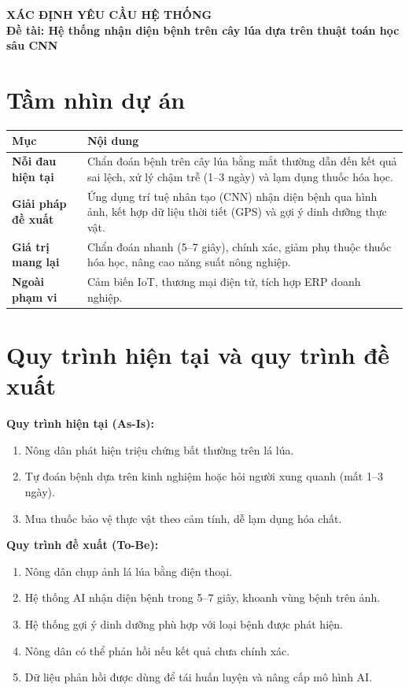 ﻿\documentclass[12pt,a4paper]{article}
\begin{document}
\begin{center}
    \Large\textbf{XÁC ĐỊNH YÊU CẦU HỆ THỐNG} \\
    \vspace{0.2cm}
    \large\textbf{Đề tài: Hệ thống nhận diện bệnh trên cây lúa dựa trên thuật toán học sâu CNN}
\end{center}

\section*{Tầm nhìn dự án}

\begin{longtable}{|p{3.5cm}|p{11cm}|}
\hline
\rowcolor{headerblue}
\textbf{Mục} & \textbf{Nội dung} \\
\hline
\textbf{Nỗi đau hiện tại} & Chẩn đoán bệnh trên cây lúa bằng mắt thường dẫn đến kết quả sai lệch, xử lý chậm trễ (1--3 ngày) và lạm dụng thuốc hóa học. \\
\hline
\textbf{Giải pháp đề xuất} & Ứng dụng trí tuệ nhân tạo (CNN) nhận diện bệnh qua hình ảnh, kết hợp dữ liệu thời tiết (GPS) và gợi ý dinh dưỡng thực vật. \\
\hline
\textbf{Giá trị mang lại} & Chẩn đoán nhanh (5--7 giây), chính xác, giảm phụ thuộc thuốc hóa học, nâng cao năng suất nông nghiệp. \\
\hline
\textbf{Ngoài phạm vi} & Cảm biến IoT, thương mại điện tử, tích hợp ERP doanh nghiệp. \\
\hline
\end{longtable}

\section*{Quy trình hiện tại và quy trình đề xuất}

\textbf{Quy trình hiện tại (As-Is):}
\begin{enumerate}
    \item Nông dân phát hiện triệu chứng bất thường trên lá lúa.
    \item Tự đoán bệnh dựa trên kinh nghiệm hoặc hỏi người xung quanh (mất 1--3 ngày).
    \item Mua thuốc bảo vệ thực vật theo cảm tính, dễ lạm dụng hóa chất.
\end{enumerate}

\textbf{Quy trình đề xuất (To-Be):}
\begin{enumerate}
    \item Nông dân chụp ảnh lá lúa bằng điện thoại.
    \item Hệ thống AI nhận diện bệnh trong 5--7 giây, khoanh vùng bệnh trên ảnh.
    \item Hệ thống gợi ý dinh dưỡng phù hợp với loại bệnh được phát hiện.
    \item Nông dân có thể phản hồi nếu kết quả chưa chính xác.
    \item Dữ liệu phản hồi được dùng để tái huấn luyện và nâng cấp mô hình AI.
\end{enumerate}
\end{document}
